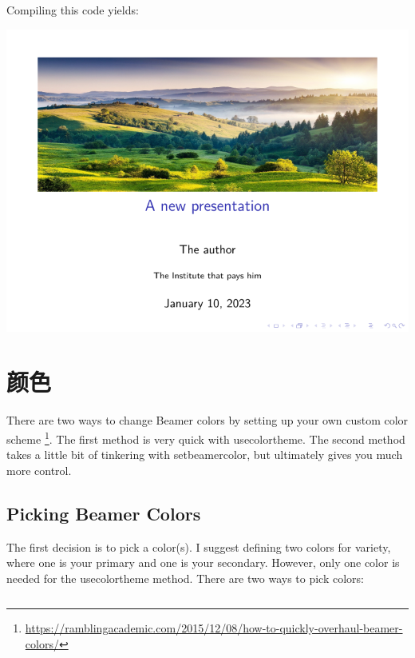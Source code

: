\begin{column}{0.5\textwidth}
\inputminted[linenos=true]{latex}{examples/beamer/beamerfigure14.tex}

Compiling this code yields:

\includegraphics{examples/beamer/beamerfigure14.pdf}

\section{颜色}

There are two ways to change Beamer colors by setting up your own custom color scheme
\footnote{\url{https://ramblingacademic.com/2015/12/08/how-to-quickly-overhaul-beamer-colors/}}. 
The first method is very quick with {\ttfamily usecolortheme}. 
The second method takes a little bit of tinkering with {\ttfamily setbeamercolor}, but ultimately gives you much more control.

\subsection{Picking Beamer Colors}

The first decision is to pick a color(s). I suggest defining two colors for variety, where one is your primary and one is your secondary. However, only one color is needed for the {\ttfamily usecolortheme} method. There are two ways to pick colors:


\end{column}
